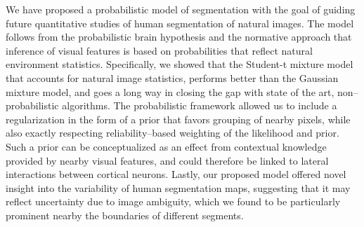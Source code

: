 \documentclass[a4paper,12pt]{article}
\begin{document}
We have proposed a probabilistic model of segmentation with the goal of guiding future quantitative studies of human segmentation of natural images. The model follows from the probabilistic brain hypothesis and the normative approach that inference of visual features is based on probabilities that reflect natural environment statistics. Specifically, we showed that the Student-t mixture model that accounts for natural image statistics, performs better than the Gaussian mixture model, and goes a long way in closing the gap with state of the art, non--probabilistic algorithms. The probabilistic framework allowed us to include a regularization in the form of a prior that favors grouping of nearby pixels, while also exactly respecting reliability--based weighting of the likelihood and prior. Such a prior can be conceptualized as an effect from contextual knowledge provided by nearby visual features, and could therefore be linked to lateral interactions between cortical neurons. Lastly, our proposed model offered novel insight into the variability of human segmentation maps, suggesting that it may reflect uncertainty due to image ambiguity, which we found to be particularly prominent nearby the boundaries of different segments.  

  



\end{document}
